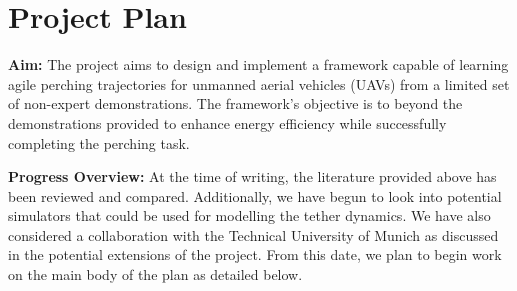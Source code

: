 \chapter{Project Plan}

\textbf{Aim: } The project aims to design and implement a framework capable of learning agile perching trajectories for unmanned aerial vehicles (UAVs) from a limited set of non-expert demonstrations. 
The framework's objective is to beyond the demonstrations provided to enhance energy efficiency while successfully completing the perching task.

\textbf{Progress Overview: } At the time of writing, the literature provided above has been reviewed and compared.
Additionally, we have begun to look into potential simulators that could be used for modelling the tether dynamics.
We have also considered a collaboration with the Technical University of Munich as discussed in the potential extensions of the project.
From this date, we plan to begin work on the main body of the plan as detailed below.

